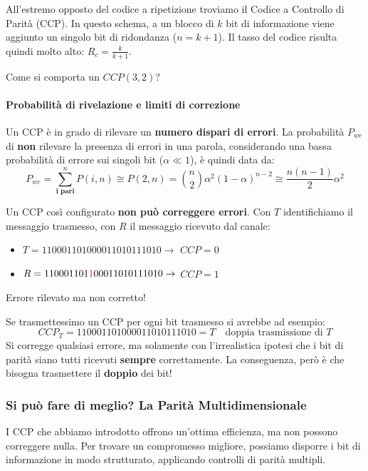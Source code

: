All'estremo opposto del codice a ripetizione troviamo il Codice a Controllo di Parità (CCP). In questo schema, a un blocco di $k$ bit di informazione viene aggiunto un singolo bit di ridondanza ($n = k+1$). Il tasso del codice risulta quindi molto alto: $R_c = \frac{k}{k+1}$.


Come si comporta un $CCP(3,2)$?


\paragraph{Probabilità di rivelazione e limiti di correzione}
Un CCP è in grado di rilevare un \textbf{numero dispari di errori}.
La probabilità $P_{we}$ di \textbf{non} rilevare la presenza di errori in una parola, considerando una bassa probabilità di errore sui singoli bit  ($\alpha \ll 1$), è quindi data da:
\[P_{we} = \sum_{\textbf{i pari}}^n P(i,n) \cong P(2,n)= \binom{n}{2}\alpha^2(1-\alpha)^{n-2} \cong \frac{n(n-1)}{2}\alpha^2 \]

Un CCP così configurato \textbf{non può correggere errori}.
Con $T$ identifichiamo il messaggio trasmesso, con $R$ il messaggio ricevuto dal canale:
\begin{itemize}
    \item $T =110001101000011010111010 \rightarrow$ $CCP=0$
    \item $R =110001101\textcolor{red}{1}00011010111010 \rightarrow$ $CCP=1$
\end{itemize}
Errore rilevato ma non corretto!

Se trasmettessimo un CCP per ogni bit trasmesso si avrebbe ad esempio:
\[CCP_T= 110001101000011010111010=T \quad\text{doppia trasmissione di }T\]
Si corregge qualsiasi errore, ma solamente con l'irrealistica ipotesi che i bit di parità siano tutti ricevuti \textbf{sempre} correttamente. La conseguenza, però è che bisogna trasmettere il \textbf{doppio} dei bit!

\subsubsection{Si può fare di meglio? La Parità Multidimensionale}
I CCP che abbiamo introdotto offrono un'ottima efficienza, ma non possono correggere nulla. Per trovare un compromesso migliore, possiamo disporre i bit di informazione in modo strutturato, applicando controlli di parità multipli.

